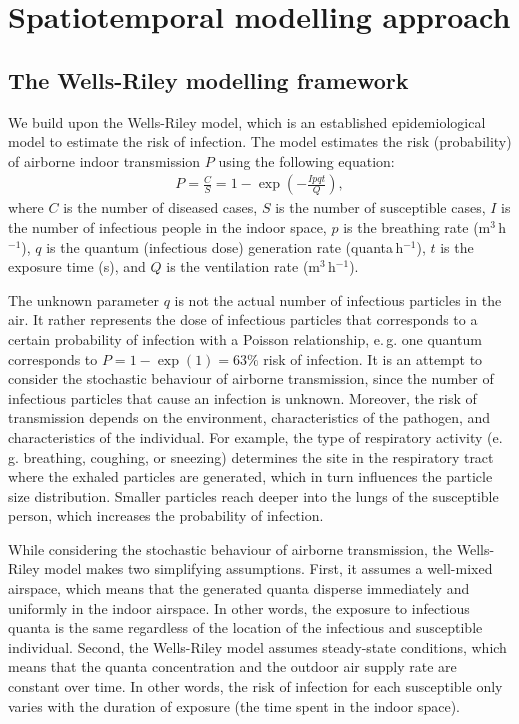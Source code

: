 \documentclass[fleqn,11pt]{wlscirep_supp}
\newcommand\eg{e.\,g.\xspace}
\begin{document}
\clearpage

\section{Spatiotemporal modelling approach}\label{sec:spattemp-model}

\subsection{The Wells-Riley modelling framework}

We build upon the Wells-Riley model\cite{Riley1961Book}, which is an established epidemiological model to estimate the risk of infection. The model estimates the risk (probability) of airborne indoor transmission $P$ using the following equation: 
\begin{align}
    P = \frac{C}{S} = 1 - \exp \left(-\frac{Ipqt}{Q}\right),
\end{align}
where $C$ is the number of diseased cases, $S$ is the number of susceptible cases, $I$ is the number of infectious people in the indoor space, $p$ is the breathing rate (m$^3$\,h$^{-1}$), $q$ is the quantum (infectious dose) generation rate (quanta\,h$^{-1}$), $t$ is the exposure time (s), and $Q$ is the ventilation rate (m$^3$\,h$^{-1}$).

The unknown parameter $q$ is not the actual number of infectious particles in the air. It rather represents the dose of infectious particles that corresponds to a certain probability of infection with a Poisson relationship, \eg one quantum corresponds to $P = 1 - \exp (1) = 63\%$ risk of infection\cite{Rudnick2003IndoorAir}. It is an attempt to consider the stochastic behaviour of airborne transmission, since the number of infectious particles that cause an infection is unknown. Moreover, the risk of transmission depends on the environment, characteristics of the pathogen, and characteristics of the individual. For example, the type of respiratory activity (\eg breathing, coughing, or sneezing) determines the site in the respiratory tract where the exhaled particles are generated, which in turn influences the particle size distribution\cite{Wei2016AMJIC}. Smaller particles reach deeper into the lungs of the susceptible person\cite{Wang2021Science}, which increases the probability of infection. 

While considering the stochastic behaviour of airborne transmission, the Wells-Riley model makes two simplifying assumptions. First, it assumes a well-mixed airspace, which means that the generated quanta disperse immediately and uniformly in the indoor airspace. In other words, the exposure to infectious quanta is the same regardless of the location of the infectious and susceptible individual. Second, the Wells-Riley model assumes steady-state conditions, which means that the quanta concentration and the outdoor air supply rate are constant over time. In other words, the risk of infection for each susceptible only varies with the duration of exposure (the time spent in the indoor space). 
\end{document}
